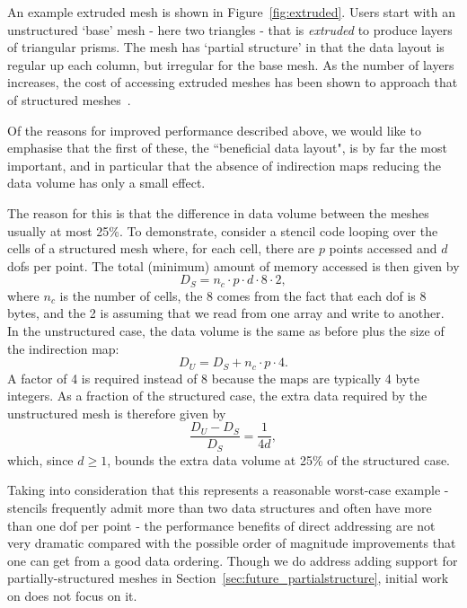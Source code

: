 An example extruded mesh is shown in Figure~\ref{fig:extruded}.
Users start with an unstructured `base' mesh - here two triangles - that is \textit{extruded} to produce layers of triangular prisms.
The mesh has `partial structure' in that the data layout is regular up each column, but irregular for the base mesh.
As the number of layers increases, the cost of accessing extruded meshes has been shown to approach that of structured meshes~\cite{berceaStructureexploitingNumberingAlgorithm2016}.

Of the reasons for improved performance described above, we would like to emphasise that the first of these, the ``beneficial data layout", is by far the most important, and in particular that the absence of indirection maps reducing the data volume has only a small effect.

The reason for this is that the difference in data volume between the meshes usually at most 25\%.
To demonstrate, consider a stencil code looping over the cells of a structured mesh where, for each cell, there are $p$ points accessed and $d$ \glspl{dof} per point.
The total (minimum) amount of memory accessed is then given by
\begin{equation*}
  D_S = n_c \cdot p \cdot d \cdot 8 \cdot 2,
\end{equation*}
where $n_c$ is the number of cells, the 8 comes from the fact that each \gls{dof} is 8 bytes, and the 2 is assuming that we read from one array and write to another.
In the unstructured case, the data volume is the same as before plus the size of the indirection map:
\begin{equation*}
  D_U = D_S + n_c \cdot p \cdot 4.
\end{equation*}
A factor of 4 is required instead of 8 because the maps are typically 4 byte integers.
As a fraction of the structured case, the extra data required by the unstructured mesh is therefore given by
\begin{equation*}
  \frac{D_U - D_S}{D_S} = \frac{1}{4d},
\end{equation*}
which, since $d \geq 1$, bounds the extra data volume at 25\% of the structured case.

Taking into consideration that this represents a reasonable worst-case example - stencils frequently admit more than two data structures and often have more than one \gls{dof} per point - the performance benefits of direct addressing are not very dramatic compared with the possible order of magnitude improvements that one can get from a good data ordering.
Though we do address adding support for partially-structured meshes in Section~\ref{sec:future_partialstructure}, initial work on  does not focus on it.
